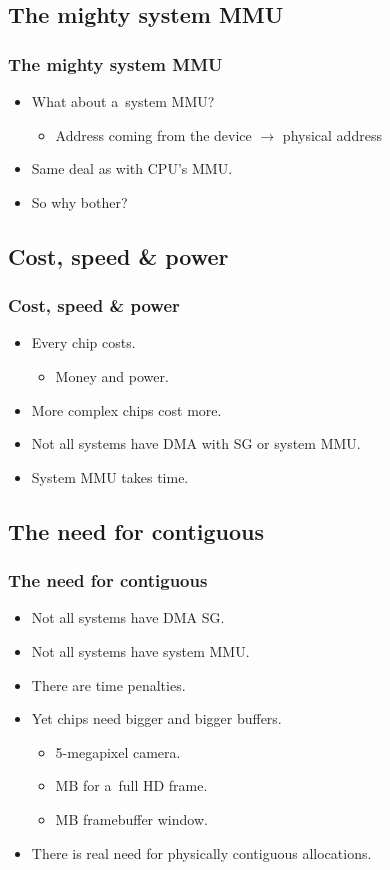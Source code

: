 \subsection{The mighty system MMU}
\begin{frame}
  \frametitle{The mighty system MMU}

  \begin{itemize}
  \item What about a~system MMU?
    \begin{itemize}
    \item Address coming from the device $\rightarrow$ physical
      address
    \end{itemize}
  \item Same deal as with CPU's MMU.
  \item So why bother?
  \end{itemize}
\end{frame}

\subsection{Cost, speed \& power}
\begin{frame}
  \frametitle{Cost, speed \& power}

  \begin{itemize}
  \item Every chip costs.
    \begin{itemize}
    \item Money and power.
    \end{itemize}
  \item More complex chips cost more.
  \item Not all systems have DMA with SG or system MMU.
  \item System MMU takes time.
  \end{itemize}
\end{frame}

\subsection{The need for contiguous}
\begin{frame}
  \frametitle{The need for contiguous}

  \begin{itemize}
  \item Not all systems have DMA SG.
  \item Not all systems have system MMU.
  \item There are time penalties.
  \item Yet chips need bigger and bigger buffers.
    \begin{itemize}
    \item 5-megapixel camera.
    \item \unit[6]{MB} for a~full HD frame.
    \item \unit[3]{MB} framebuffer window.
    \end{itemize}
  \item There is real need for physically contiguous allocations.
  \end{itemize}
\end{frame}
